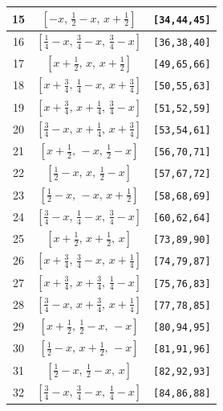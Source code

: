 \documentclass[fleqn,8pt]{jsarticle}
\begin{document}
\begin{longtable}{ccc}
15 & $\left[ - x,\, \frac{1}{2} - x,\, x + \frac{1}{2} \right]$ & {\tt [34,44,45]} \\ \hline
16 & $\left[ \frac{1}{4} - x,\, \frac{3}{4} - x,\, \frac{3}{4} - x \right]$ & {\tt [36,38,40]} \\ \hline
17 & $\left[ x + \frac{1}{2},\, x,\, x + \frac{1}{2} \right]$ & {\tt [49,65,66]} \\ \hline
18 & $\left[ x + \frac{3}{4},\, \frac{1}{4} - x,\, x + \frac{3}{4} \right]$ & {\tt [50,55,63]} \\ \hline
19 & $\left[ x + \frac{3}{4},\, x + \frac{1}{4},\, \frac{3}{4} - x \right]$ & {\tt [51,52,59]} \\ \hline
20 & $\left[ \frac{3}{4} - x,\, x + \frac{1}{4},\, x + \frac{3}{4} \right]$ & {\tt [53,54,61]} \\ \hline
21 & $\left[ x + \frac{1}{2},\, - x,\, \frac{1}{2} - x \right]$ & {\tt [56,70,71]} \\ \hline
22 & $\left[ \frac{1}{2} - x,\, x,\, \frac{1}{2} - x \right]$ & {\tt [57,67,72]} \\ \hline
23 & $\left[ \frac{1}{2} - x,\, - x,\, x + \frac{1}{2} \right]$ & {\tt [58,68,69]} \\ \hline
24 & $\left[ \frac{3}{4} - x,\, \frac{1}{4} - x,\, \frac{3}{4} - x \right]$ & {\tt [60,62,64]} \\ \hline
25 & $\left[ x + \frac{1}{2},\, x + \frac{1}{2},\, x \right]$ & {\tt [73,89,90]} \\ \hline
26 & $\left[ x + \frac{3}{4},\, \frac{3}{4} - x,\, x + \frac{1}{4} \right]$ & {\tt [74,79,87]} \\ \hline
27 & $\left[ x + \frac{3}{4},\, x + \frac{3}{4},\, \frac{1}{4} - x \right]$ & {\tt [75,76,83]} \\ \hline
28 & $\left[ \frac{3}{4} - x,\, x + \frac{3}{4},\, x + \frac{1}{4} \right]$ & {\tt [77,78,85]} \\ \hline
29 & $\left[ x + \frac{1}{2},\, \frac{1}{2} - x,\, - x \right]$ & {\tt [80,94,95]} \\ \hline
30 & $\left[ \frac{1}{2} - x,\, x + \frac{1}{2},\, - x \right]$ & {\tt [81,91,96]} \\ \hline
31 & $\left[ \frac{1}{2} - x,\, \frac{1}{2} - x,\, x \right]$ & {\tt [82,92,93]} \\ \hline
32 & $\left[ \frac{3}{4} - x,\, \frac{3}{4} - x,\, \frac{1}{4} - x \right]$ & {\tt [84,86,88]} \\
\end{longtable}
\renewcommand{\arraystretch}{1.2}
\end{document}
